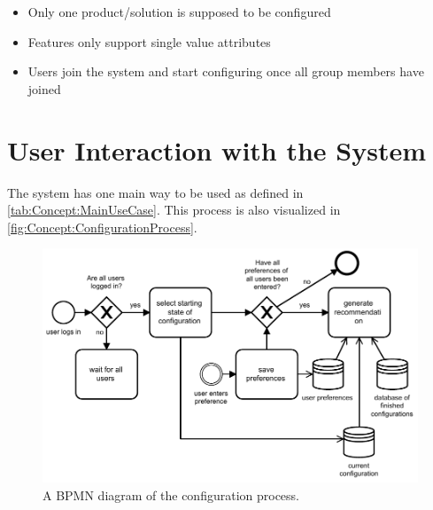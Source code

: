 \begin{itemize}
    \item Only one product/solution is supposed to be configured
    \item Features only support single value attributes
    \item Users join the system and start configuring once all group members have joined
\end{itemize}

\section{User Interaction with the System}
\label{sec:Concept:UserSystemInteraction}

The system has one main way to be used as defined in \autoref{tab:Concept:MainUseCase}. This process is also visualized in \autoref{fig:Concept:ConfigurationProcess}.

\begin{figure}
    \centering
    \includegraphics[width=1\textwidth]{./figures/40_concept/bpmn_configuration_process_with_continious_recommendation.pdf}
    \caption{A BPMN diagram of the configuration process.}
    \label{fig:Concept:ConfigurationProcess}
\end{figure}

